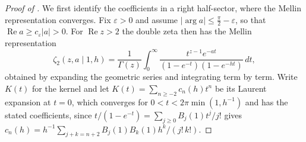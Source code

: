 \documentclass[11pt,letterpaper]{article}
\newcommand{\Zt}{\zeta_2}
\DeclareMathOperator{\Real}{Re}
\begin{document}
\begin{proof}[Proof of ]
We first identify the coefficients in a right half-sector, where the Mellin
representation converges. Fix $\varepsilon>0$ and assume
$\lvert\arg a\rvert\le\tfrac{\pi}{2}-\varepsilon$, so that
$\Real a\ge c_\varepsilon\lvert a\rvert>0$. For $\Real z>2$ the double zeta then
has the Mellin representation
\begin{equation}
  \Zt(z,a\mid1,h)=\frac{1}{\Gamma(z)}\int_0^{\infty}
  \frac{t^{z-1}e^{-at}}{(1-e^{-t})(1-e^{-ht})}\,dt ,
  \label{eq:mellin}
\end{equation}
obtained by expanding the geometric series and integrating term by term. Write
$K(t)$ for the kernel and let $K(t)=\sum_{n\ge-2}c_n(h)t^{n}$ be its Laurent
expansion at $t=0$, which converges for $0<t<2\pi\min(1,h^{-1})$ and has the
stated coefficients, since
$t/(1-e^{-t})=\sum_{j\ge0}B_j(1)t^{j}/j!$ gives
$c_n(h)=h^{-1}\sum_{j+k=n+2}B_j(1)B_k(1)h^{k}/(j!\,k!)$.


\end{proof}
\end{document}
